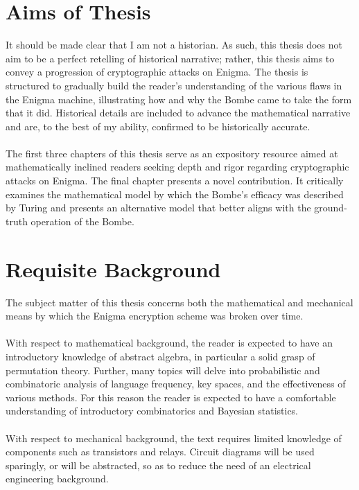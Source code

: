 \documentclass{dcthesis}
\theoremstyle{definition}
\theoremstyle{remark}
\begin{document}
\chapter*{Aims of Thesis}
It should be made clear that I am not a historian. As such, this
thesis does not aim to be a perfect retelling of historical
narrative; rather, this thesis aims to convey a
progression of cryptographic attacks on Enigma. The thesis is
structured to gradually build the reader's
understanding of the various flaws in the Enigma machine,
illustrating how and why the Bombe came to take the form that it did.
Historical details are included to advance the mathematical narrative
and are, to the best of my ability, confirmed to be historically accurate.
\\\\The first three chapters of this thesis serve as an expository
resource aimed at mathematically inclined readers seeking depth and
rigor regarding cryptographic attacks on Enigma. The final chapter
presents a novel contribution. It critically examines the
mathematical model by which the Bombe's efficacy was described by
Turing and presents an alternative model that better aligns with the
ground-truth operation of the Bombe.

\chapter*{Requisite Background}
The subject matter of this thesis concerns both the mathematical and
mechanical means by which the Enigma encryption scheme was broken over time.
\\\\With respect to mathematical background, the reader is expected
to have an introductory knowledge of abstract algebra, in particular
a solid grasp of permutation theory. Further, many topics will delve
into probabilistic and combinatoric analysis of language frequency,
key spaces, and the effectiveness of various methods. For this reason
the reader is expected to have a comfortable understanding of
introductory combinatorics and Bayesian statistics.
\\\\With respect to mechanical background, the text requires
limited knowledge of components such as transistors and relays.
Circuit diagrams will be used sparingly, or will be abstracted, so as
to reduce the need of an electrical engineering background.
\end{document}
